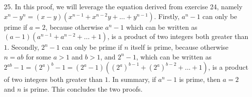 \documentclass{article}
\begin{document}
25. In this proof, we will leverage the equation derived from exercise 24, namely $x^n - y^n = (x - y)(x^{n-1} + x^{n-2}y + ... + y^{n-1})$. Firstly, $a^n - 1$ can only be prime if $a = 2$, because otherwise $a^n - 1$ which can be written as $(a - 1)(a^{n - 1} + a^{n - 2} + ... + 1)$, is a product of two integers both greater than $1$. Secondly, $2^n - 1$ can only be prime if $n$ itself is prime, because otherwise $n = ab$ for some $a > 1$ and $b > 1$, and $2^n - 1$, which can be written as $2^{ab} - 1 = (2^a)^b - 1 = (2^a - 1)((2^a)^{b - 1} + (2^a)^{b - 2} + ... + 1)$, is a product of two integers both greater than $1$. In summary, if $a^n - 1$ is prime, then $a = 2$ and $n$ is prime. This concludes the two proofs.
\end{document}
